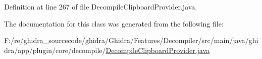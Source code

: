 Definition at line 267 of file Decompile\+Clipboard\+Provider.\+java.



The documentation for this class was generated from the following file\+:\begin{DoxyCompactItemize}
\item 
F\+:/re/ghidra\+\_\+sourcecode/ghidra/\+Ghidra/\+Features/\+Decompiler/src/main/java/ghidra/app/plugin/core/decompile/\mbox{\hyperlink{_decompile_clipboard_provider_8java}{Decompile\+Clipboard\+Provider.\+java}}\end{DoxyCompactItemize}
